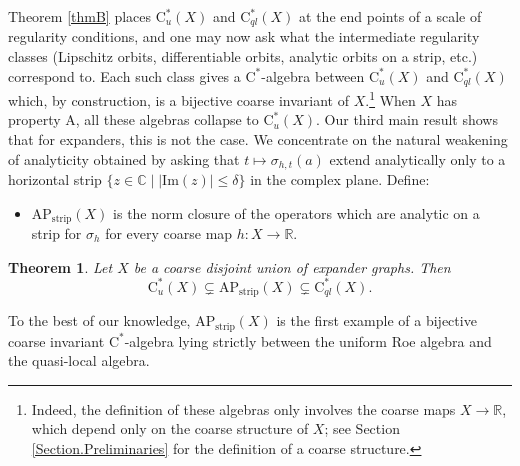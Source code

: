 \documentclass[11pt]{amsart}
\newcommand{\R}{\mathbb{R}}
\numberwithin{equation}{section}
\newtheorem{theoremi}{Theorem}
\theoremstyle{definition}
\theoremstyle{remark}
\begin{document}
Theorem \ref{thmB} places $\mathrm{C}^*_u(X)$ and $\mathrm{C}^*_{ql}(X)$ at the
 end points of a scale of regularity conditions, and one may now ask what the
intermediate regularity classes (Lipschitz orbits, differentiable orbits, analytic
orbits on a strip, etc.) correspond to. Each such class gives a
$\mathrm{C}^*$-algebra between $\mathrm{C}^*_u(X)$ and $\mathrm{C}^*_{ql}(X)$ which,
by construction, is a bijective coarse invariant of $X$.\footnote{Indeed, the definition
of these algebras only involves the coarse maps $X\to\mathbb{R}$, which depend
only on the coarse structure of $X$; see Section \ref{Section.Preliminaries} for the definition of a coarse structure.} When $X$ has property
A, all these algebras collapse to $\mathrm{C}^*_u(X)$. Our third main result shows
that for expanders, this is not the case. We concentrate on the natural weakening
of analyticity obtained by asking that $t\mapsto \sigma_{h,t}(a)$ extend
analytically only to a horizontal strip $\{z\in\mathbb{C}\mid |\mathrm{Im}(z)|\le\delta\}$ 
in the complex plane. Define: 
\begin{itemize}\item $\mathrm{AP}_{\mathrm{strip}}(X)$ is  the norm
closure of the operators which are analytic on a strip for $\sigma_h$ for every
coarse map $h\colon X\to \R$.\end{itemize}

\begin{theoremi}\label{thmC}
Let $X$ be a coarse disjoint union of expander graphs. Then
\[
\mathrm{C}^*_u(X)\subsetneq \mathrm{AP}_{\mathrm{strip}}(X)\subsetneq \mathrm{C}^*_{ql}(X).
\]
\end{theoremi}

To the best of our knowledge, $\mathrm{AP}_{\mathrm{strip}}(X)$ is the first
example of a  bijective coarse invariant $\mathrm{C}^*$-algebra lying strictly between the
uniform Roe algebra and the quasi-local algebra. 
\end{document}
